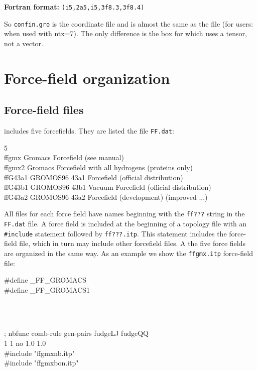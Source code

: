 {\bf Fortran format:} {\tt (i5,2a5,i5,3f8.3,3f8.4)}

So {\tt confin.gro} is the {\gromacs} coordinate file and is almost
the same as the  file (for {\gromos} users: when used with
ntx=7).  The only difference is the box for which {\gromacs} uses a
tensor, not a vector.

\section{Force-field organization }
\label{sec:fforganization}

\subsection{Force-field files}
\label{subsec:fffiles}
{\gromacs} {\gmxver} includes five forcefields.
They are listed the file {\tt FF.dat}:

\begin{tt}
5\\
ffgmx   Gromacs Forcefield (see manual)\\
ffgmx2  Gromacs Forcefield with all hydrogens (proteins only)\\
ffG43a1 GROMOS96 43a1 Forcefield (official distribution)\\
ffG43b1 GROMOS96 43b1 Vacuum Forcefield (official distribution)\\
ffG43a2 GROMOS96 43a2 Forcefield (development) (improved ...)\\
\end{tt}

All files for each force field have names beginning with the {\tt ff???}
string in the {\tt FF.dat} file.
A force field is included at the beginning of a topology file with an
{\tt \#include} statement followed by {\tt ff???.itp}.
This statement includes the force-field file,
which in turn may include other forcefield files. A the five force fields
are organized in the same way. As an example we show the {\tt ffgmx.itp}
force-field file:

\begin{tt}
\#define \_FF\_GROMACS\\
\#define \_FF\_GROMACS1\\
\end{tt}\\
\begin{tt}
[ defaults ]\\
; nbfunc        comb-rule       gen-pairs       fudgeLJ fudgeQQ\\
  1             1               no              1.0     1.0\\

\#include "ffgmxnb.itp"\\
\#include "ffgmxbon.itp"\\
\end{tt}

